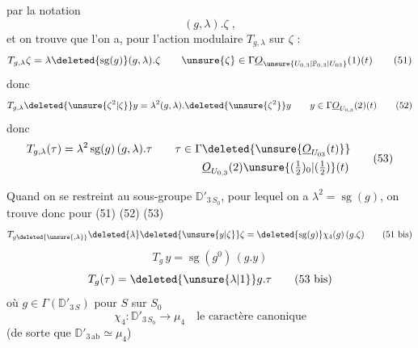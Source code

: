  par la notation 
\[
(g,\lambda).\zeta\;,
\]
et on trouve que l'on a, pour l'action modulaire $T_{g,\lambda}$ sur $\zeta$ :
\[
T_{g,\lambda}\zeta=\lambda\deleted{\operatorname{sg}(g)}(g,\lambda).\zeta
\qquad \unsure{\zeta}\in\Gamma\underline O_{\unsure{U_{0,3}|\mathbb P_{0,3}|U_{03}}}(1)(t) \tag*{(51)}
\]
donc
\[
T_{g,\lambda}\deleted{\unsure{\zeta^2|\zeta}}y=\lambda^2(g,\lambda).\deleted{\unsure{\zeta^2}}y
\qquad y\in\Gamma\underline O_{U_{0,3}}(2)(t) \tag*{(52)}
\]
donc
\[
\begin{aligned}
T_{g,\lambda}(\tau)&=\lambda^2\operatorname{sg}(g)\,(g,\lambda).\tau
\qquad \tau\in\Gamma\deleted{\unsure{\underline O_{U_{03}}(t)}}\\
&\hphantom{{}=\lambda^2\operatorname{sg}(g)\,(g,\lambda).\tau\qquad \tau\in\Gamma}
\underline O_{U_{0,3}}(2)\unsure{(\tfrac12)_0|(\tfrac12)}(t)
\end{aligned} \tag*{(53)}
\]

Quand on se restreint au sous-groupe $\mathbb D'_{3\,S_0}$, pour lequel on a $\lambda^2=\operatorname{sg}(g)$, on trouve donc pour (51) (52) (53)
\[
T_{g\deleted{\unsure{,\lambda}}}\deleted{\lambda}\deleted{\unsure{y|\zeta}}\zeta=
\deleted{\operatorname{sg}(g)}\chi_4(g)\,(g.\zeta) \tag*{(51 bis)}
\]
\[
T_g\,y=\operatorname{sg}(g^0)\,(g.y) \tag*{(52 bis)}
\]
\[
T_g(\tau)=\deleted{\unsure{\lambda|1}}g.\tau \tag*{(53 bis)}
\]
où $g\in\Gamma(\mathbb D'_{3\,S})$ pour $S$ sur $S_0$
\[
\chi_4:\mathbb D'_{3\,S_0}\longrightarrow\mu_4
\quad\text{le caractère canonique} \tag*{(54)}
\]
(de sorte que $\mathbb D'_{3\,\mathrm{ab}}\simeq\mu_4$)
